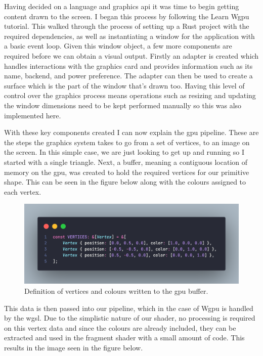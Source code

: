 \documentclass[titlepage]{article}
\begin{document}
Having decided on a language and graphics \acrshort{api} it was time to begin getting content drawn to the screen. I began this process by following the Learn Wgpu \cite{wgpu:tutorial} tutorial. This walked through the process of setting up a Rust project with the required dependencies, as well as instantiating a window for the application with a basic event loop. Given this window object, a few more components are required before we can obtain a visual output. Firstly an adapter is created which handles interactions with the graphics card and provides information such as its name, backend, and power preference. The adapter can then be used to create a surface which is the part of the window that's drawn too. Having this level of control over the graphics process means operations such as resizing and updating the window dimensions need to be kept performed manually so this was also implemented here.

With these key components created I can now explain the \acrshort{gpu} pipeline. These are the steps the graphics system takes to go from a set of vertices, to an image on the screen. In this simple case, we are just looking to get up and running so I started with a single triangle. Next, a buffer, meaning a contiguous location of memory on the \acrshort{gpu}, was created to hold the required vertices for our primitive shape. This can be seen in the figure below along with the colours assigned to each vertex.

\begin{figure}[htp]
    \centering
    \includegraphics[width=0.75 \textwidth]{triangle_vertices.png}
    \caption{Definition of vertices and colours written to the \acrshort{gpu} buffer.}
\end{figure}
\FloatBarrier

This data is then passed into our pipeline, which in the case of Wgpu is handled by the \acrfull{wgsl}. Due to the simplistic nature of our shader, no processing is required on this vertex data and since the colours are already included, they can be extracted and used in the fragment shader with a small amount of code. This results in the image seen in the figure below.
\end{document}
